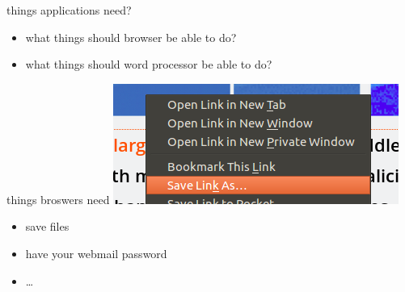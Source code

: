 
\begin{frame}{things applications need?}
    \begin{itemize}
    \item what things should browser be able to do?
    \item what things should word processor be able to do?
    \end{itemize}
\end{frame}

\begin{frame}{things broswers need}
    \includegraphics[width=.5\textwidth]{../sandbox/savelinkas}
    \begin{itemize}
        \item save files
        \item have your webmail password
        \item \ldots
    \end{itemize}
\end{frame}
